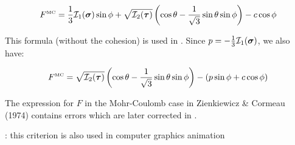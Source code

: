 \begin{mdframed}[backgroundcolor=blue!5]
\begin{equation}
F^{\text{\tiny MC}}=\frac{1}{3} {\cal I}_1({\bm \sigma}) \sin \phi  + 
\sqrt{  {\cal I}_2({\bm \tau})  } \left( \cos \theta - \frac{1}{\sqrt{3}} \sin \theta  \sin \phi \right) - c \cos \phi
\label{eq:mcF} 
\end{equation}
\end{mdframed}
This formula (without the cohesion) is used in \textcite{will92}.
Since $p=-\frac{1}{3} {\cal I}_1({\bm \sigma})$, we also have:
\begin{mdframed}[backgroundcolor=blue!5]
\begin{equation}
F^{\text{\tiny MC}}=
\sqrt{  {\cal I}_2({\bm \tau})  } \left( \cos \theta - \frac{1}{\sqrt{3}} \sin \theta  \sin \phi \right) - (p \sin\phi + c \cos \phi)
\end{equation}
\end{mdframed}

\begin{remark}
The expression for $F$ in the Mohr-Coulomb case in Zienkiewicz \& Cormeau (1974) \cite{zico74} 
contains errors which are later corrected in \textcite[p102]{book_zitf}. 
\end{remark}

\Literature: this criterion is also used in computer graphics animation \cite{zhbr05}




\vspace{.5cm}

